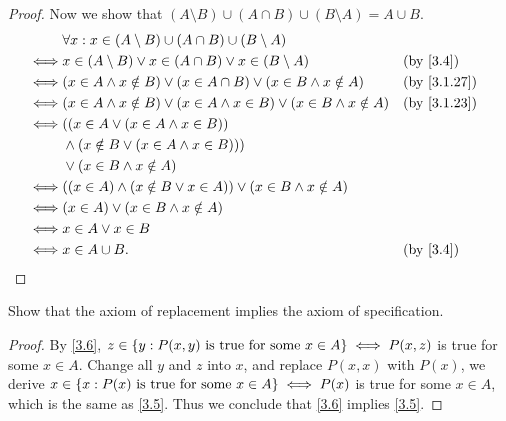 \begin{proof}
	Now we show that \((A \setminus B) \cup (A \cap B) \cup (B \setminus A) = A \cup B\).
	\begin{align*}
		     & \forall x : x \in (A \setminus B) \cup (A \cap B) \cup (B \setminus A)                                   \\
		\iff & x \in (A \setminus B) \lor x \in (A \cap B) \lor x \in (B \setminus A)                  &  & \by{3.4}    \\
		\iff & (x \in A \land x \notin B) \lor (x \in A \cap B) \lor (x \in B \land x \notin A)        &  & \by{3.1.27} \\
		\iff & (x \in A \land x \notin B) \lor (x \in A \land x \in B) \lor (x \in B \land x \notin A) &  & \by{3.1.23} \\
		\iff & ((x \in A \lor (x \in A \land x \in B))                                                                  \\
		     & \land (x \notin B \lor (x \in A \land x \in B)))                                                         \\
		     & \lor (x \in B \land x \notin A)                                                                          \\
		\iff & ((x \in A) \land (x \notin B \lor x \in A)) \lor (x \in B \land x \notin A)                              \\
		\iff & (x \in A) \lor (x \in B \land x \notin A)                                                                \\
		\iff & x \in A \lor x \in B                                                                                     \\
		\iff & x \in A \cup B.                                                                         &  & \by{3.4}
	\end{align*}
\end{proof}

\begin{ex}\label{ex:3.1.11}
	Show that the axiom of replacement implies the axiom of specification.
\end{ex}

\begin{proof}
	By \cref{3.6}, \(z \in \left\lbrace y : P(x, y) \text{ is true for some } x \in A\right\rbrace \iff P(x, z)\) is true for some \(x \in A\).
	Change all \(y\) and \(z\) into \(x\), and replace \(P(x, x)\) with \(P(x)\), we derive \(x \in \left\lbrace x : P(x) \text{ is true for some } x \in A\right\rbrace \iff P(x)\) is true for some \(x \in A\), which is the same as \cref{3.5}.
	Thus we conclude that \cref{3.6} implies \cref{3.5}.
\end{proof}